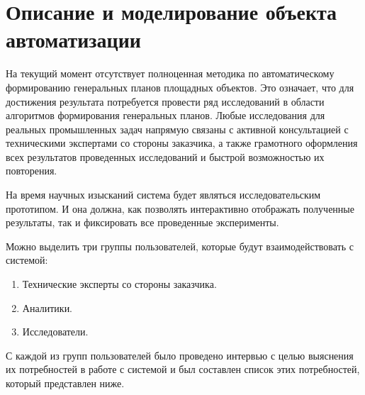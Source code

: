 \section*{\large{Описание и моделирование объекта автоматизации}}

На текущий момент отсутствует полноценная методика
по автоматическому формированию генеральных планов площадных объектов.
Это означает, что для достижения результата потребуется провести ряд исследований в области алгоритмов
формирования генеральных планов.
Любые исследования для реальных промышленных задач напрямую связаны с активной консультацией с техническими
экспертами со стороны заказчика, а также грамотного оформления всех результатов проведенных исследований
и быстрой возможностью их повторения.

На время научных изысканий система будет являться исследовательским прототипом.
И она должна, как позволять интерактивно отображать полученные результаты,
так и фиксировать все проведенные эксперименты.


Можно выделить три группы пользователей, которые будут взаимодействовать с системой:
\begin{enumerate}
    \item Технические эксперты со стороны заказчика.
    \item Аналитики.
    \item Исследователи.
\end{enumerate}

С каждой из групп пользователей было проведено интервью с целью выяснения их потребностей в работе с системой
и был составлен список этих потребностей, который представлен ниже.

